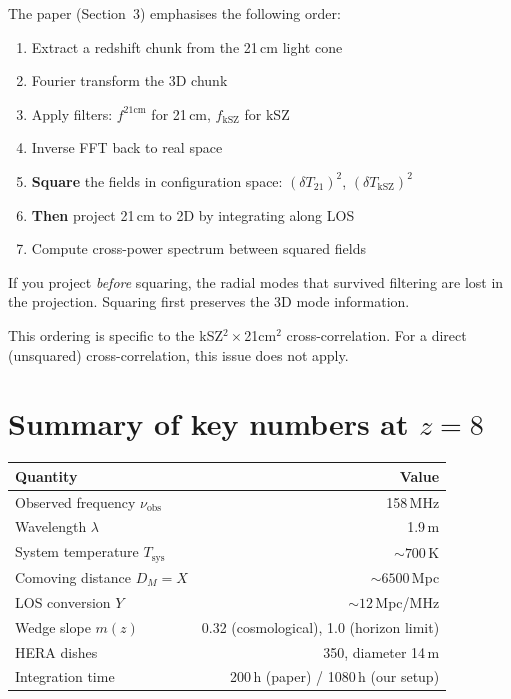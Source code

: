 \documentclass[11pt,a4paper]{article}
\newcommand{\Tsys}{T_\mathrm{sys}}
\begin{document}
The paper (Section~3) emphasises the following order:
\begin{enumerate}
    \item Extract a redshift chunk from the 21\,cm light cone
    \item Fourier transform the 3D chunk
    \item Apply filters: $f^{21\mathrm{cm}}$ for 21\,cm, $f_\mathrm{kSZ}$ for kSZ
    \item Inverse FFT back to real space
    \item \textbf{Square} the fields in configuration space: $(\delta T_{21})^2$, $(\delta T_\mathrm{kSZ})^2$
    \item \textbf{Then} project 21\,cm to 2D by integrating along LOS
    \item Compute cross-power spectrum between squared fields
\end{enumerate}

If you project \emph{before} squaring, the radial modes that survived filtering are lost in the projection. Squaring first preserves the 3D mode information.

This ordering is specific to the kSZ$^2\times$21cm$^2$ cross-correlation. For a direct (unsquared) cross-correlation, this issue does not apply.

\section{Summary of key numbers at $z=8$}

\begin{table}[h]
\centering
\begin{tabular}{lr}
\toprule
Quantity & Value \\
\midrule
Observed frequency $\nu_\mathrm{obs}$ & 158\,MHz \\
Wavelength $\lambda$ & 1.9\,m \\
System temperature $\Tsys$ & $\sim 700$\,K \\
Comoving distance $D_M = X$ & $\sim 6500$\,Mpc \\
LOS conversion $Y$ & $\sim 12$\,Mpc/MHz \\
Wedge slope $m(z)$ & 0.32 (cosmological), 1.0 (horizon limit) \\
HERA dishes & 350, diameter 14\,m \\
Integration time & 200\,h (paper) / 1080\,h (our setup) \\
\bottomrule
\end{tabular}
\end{table}
\end{document}
